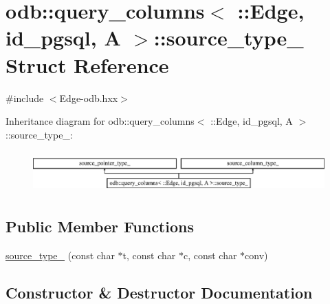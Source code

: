 \hypertarget{structodb_1_1query__columns_3_01_1_1_edge_00_01id__pgsql_00_01_a_01_4_1_1source__type__}{}\section{odb\+:\+:query\+\_\+columns$<$ \+:\+:Edge, id\+\_\+pgsql, A $>$\+:\+:source\+\_\+type\+\_\+ Struct Reference}
\label{structodb_1_1query__columns_3_01_1_1_edge_00_01id__pgsql_00_01_a_01_4_1_1source__type__}


{\ttfamily \#include $<$Edge-\/odb.\+hxx$>$}

Inheritance diagram for odb\+:\+:query\+\_\+columns$<$ \+:\+:Edge, id\+\_\+pgsql, A $>$\+:\+:source\+\_\+type\+\_\+\+:\begin{figure}[H]
\begin{center}
\leavevmode
\includegraphics[height=1.613833cm]{d1/d74/structodb_1_1query__columns_3_01_1_1_edge_00_01id__pgsql_00_01_a_01_4_1_1source__type__}
\end{center}
\end{figure}
\subsection*{Public Member Functions}
\begin{DoxyCompactItemize}
\item 
\hyperlink{structodb_1_1query__columns_3_01_1_1_edge_00_01id__pgsql_00_01_a_01_4_1_1source__type___a28c420842e9d28fa74411050cfecab6c}{source\+\_\+type\+\_\+} (const char $\ast$t, const char $\ast$c, const char $\ast$conv)
\end{DoxyCompactItemize}


\subsection{Constructor \& Destructor Documentation}
\hypertarget{structodb_1_1query__columns_3_01_1_1_edge_00_01id__pgsql_00_01_a_01_4_1_1source__type___a28c420842e9d28fa74411050cfecab6c}{}

